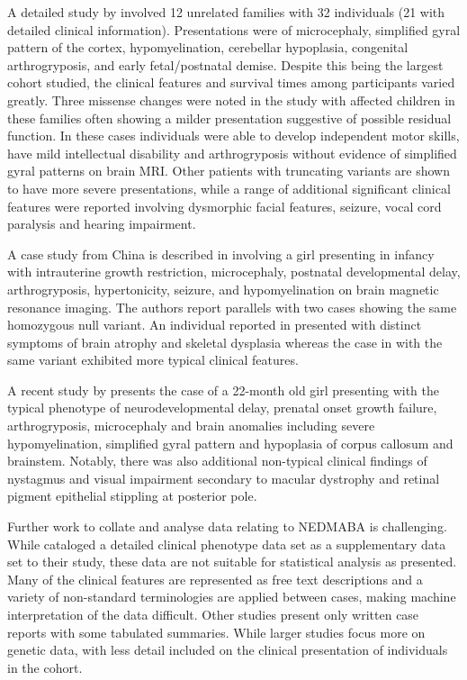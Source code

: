 \documentclass[
  authoryear,
  preprint,
  3p]{elsarticle}
\begin{document}
A detailed study by \citet{magini2019loss} involved 12 unrelated
families with 32 individuals (21 with detailed clinical information).
Presentations were of microcephaly, simplified gyral pattern of the
cortex, hypomyelination, cerebellar hypoplasia, congenital
arthrogryposis, and early fetal/postnatal demise. Despite this being the
largest cohort studied, the clinical features and survival times among
participants varied greatly. Three missense changes were noted in the
study with affected children in these families often showing a milder
presentation suggestive of possible residual function. In these cases
individuals were able to develop independent motor skills, have mild
intellectual disability and arthrogryposis without evidence of
simplified gyral patterns on brain MRI. Other patients with truncating
variants are shown to have more severe presentations, while a range of
additional significant clinical features were reported involving
dysmorphic facial features, seizure, vocal cord paralysis and hearing
impairment.

A case study from China is described in \citet{ji2022case} involving a
girl presenting in infancy with intrauterine growth restriction,
microcephaly, postnatal developmental delay, arthrogryposis,
hypertonicity, seizure, and hypomyelination on brain magnetic resonance
imaging. The authors report parallels with two cases showing the same
homozygous null variant. An individual reported in
\citet{monies2019lessons} presented with distinct symptoms of brain
atrophy and skeletal dysplasia whereas the case in
\citet{magini2019loss} with the same variant exhibited more typical
clinical features.

A recent study by \citet{bijarnia2022growth} presents the case of a
22-month old girl presenting with the typical phenotype of
neurodevelopmental delay, prenatal onset growth failure, arthrogryposis,
microcephaly and brain anomalies including severe hypomyelination,
simplified gyral pattern and hypoplasia of corpus callosum and
brainstem. Notably, there was also additional non-typical clinical
findings of nystagmus and visual impairment secondary to macular
dystrophy and retinal pigment epithelial stippling at posterior pole.

Further work to collate and analyse data relating to NEDMABA is
challenging. While \citet{magini2019loss} cataloged a detailed clinical
phenotype data set as a supplementary data set to their study, these
data are not suitable for statistical analysis as presented. Many of the
clinical features are represented as free text descriptions and a
variety of non-standard terminologies are applied between cases, making
machine interpretation of the data difficult. Other studies
\citep{ji2022case, bijarnia2022growth} present only written case reports
with some tabulated summaries. While larger studies
\citep{ravenscroft2021neurogenetic, monies2019lessons} focus more on
genetic data, with less detail included on the clinical presentation of
individuals in the cohort.
\end{document}
